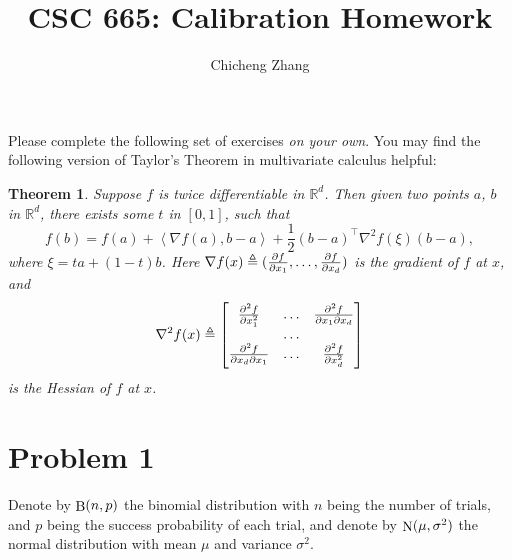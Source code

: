 \documentclass{article}
\title{CSC 665: Calibration Homework}
\author{Chicheng Zhang}
\newtheorem{theorem}{Theorem}
\DeclareMathOperator*{\Bin}{{\rm B}}
\DeclareMathOperator*{\N}{{\rm N}}
\newcommand{\RR}{\mathbb{R}} %
\newcommand{\defeq}{\triangleq}
\newcommand{\inner}[2]{\left\langle #1,#2 \right\rangle}
\begin{document}
\maketitle

Please complete the following set of exercises {\em on your own}.
You may find the following version of Taylor's Theorem in multivariate
calculus helpful:
\begin{theorem}
Suppose $f$ is twice differentiable in $\RR^d$. Then given two points $a$, $b$ in
$\RR^d$, there exists some $t$ in $[0,1]$, such that
\[ f(b) = f(a) + \inner{\nabla f(a)}{b - a} + \frac 1 2 (b - a)^\top \nabla^2 f(\xi) (b-a), \]
where $\xi = t a + (1-t) b$.
Here $\nabla f (x) \defeq (\pdv{f}{x_1}, \ldots, \pdv{f}{x_d})$ is the gradient of $f$ at $x$,
and
\[ \nabla^2 f (x) \defeq \begin{bmatrix} \pdv[2]{f}{x_1} & \ldots & \pdv{f}{x_1}{x_d} \\ & \ldots &  \\ \pdv{f}{x_d}{x_1} & \ldots & \pdv[2]{f}{x_d} \end{bmatrix}\]
is the Hessian of $f$ at $x$.
\end{theorem}


\section*{Problem 1}
Denote by $\Bin(n,p)$ the binomial distribution with $n$ being the number of trials,
and $p$ being the success probability of each trial,
and denote by $\N(\mu, \sigma^2)$ the normal distribution with mean $\mu$ and variance
$\sigma^2$.
\end{document}
